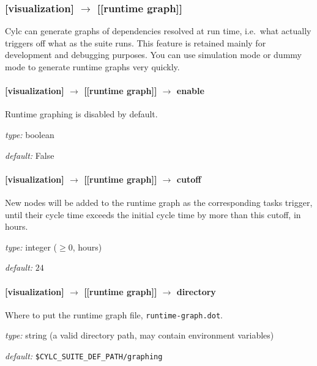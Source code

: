 \subsubsection[{[[}runtime graph{]]}]{[visualization] $\rightarrow$ [[runtime graph]]}

Cylc can generate graphs of dependencies resolved at run time, i.e.\ what 
actually triggers off what as the suite runs. This feature is retained
mainly for development and debugging purposes. You can use simulation
mode or dummy mode to generate runtime graphs very quickly.

\paragraph[enable]{[visualization] $\rightarrow$ [[runtime graph]] $\rightarrow$ enable}

Runtime graphing is disabled by default.
\begin{myitemize}
    \item {\em type:} boolean
    \item {\em default:} False
\end{myitemize}

\paragraph[cutoff]{[visualization] $\rightarrow$ [[runtime graph]] $\rightarrow$ cutoff}

New nodes will be added to the runtime graph as the corresponding tasks
trigger, until their cycle time exceeds the initial cycle time by more
than this cutoff, in hours.

\begin{myitemize}
    \item {\em type:} integer ($\geq 0$, hours)
    \item {\em default:} $24$
\end{myitemize}

\paragraph[directory]{[visualization] $\rightarrow$ [[runtime graph]] $\rightarrow$ directory}

Where to put the runtime graph file, \lstinline=runtime-graph.dot=.

\begin{myitemize}
    \item {\em type:} string (a valid directory path, may contain environment variables)
    \item {\em default:} \lstinline=$CYLC_SUITE_DEF_PATH/graphing=
\end{myitemize}

